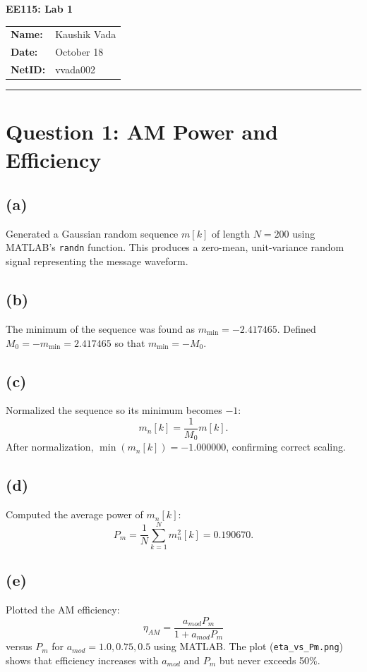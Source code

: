 \documentclass[11pt]{article}
\begin{document}
\begin{center}
  {\LARGE \textbf{EE115: Lab 1}}
\end{center}
\vspace{-0.25em}

\noindent
\begin{tabular}{@{}ll}
\textbf{Name:}  & Kaushik Vada \\
\textbf{Date:}  & October 18 \\
\textbf{NetID:} & vvada002
\end{tabular}

\vspace{0.75em}
\hrule
\vspace{1em}

\section*{Question 1: AM Power and Efficiency}

\subsection*{(a)}
Generated a Gaussian random sequence \( m[k] \) of length \( N = 200 \) using MATLAB's \texttt{randn} function. This produces a zero-mean, unit-variance random signal representing the message waveform.

\subsection*{(b)}
The minimum of the sequence was found as \( m_{\text{min}} = -2.417465 \). Defined \( M_0 = -m_{\text{min}} = 2.417465 \) so that \( m_{\text{min}} = -M_0 \).

\subsection*{(c)}
Normalized the sequence so its minimum becomes \(-1\):
\[
m_n[k] = \frac{1}{M_0} m[k].
\]
After normalization, \(\min(m_n[k]) = -1.000000\), confirming correct scaling.

\subsection*{(d)}
Computed the average power of \( m_n[k] \):
\[
P_m = \frac{1}{N} \sum_{k=1}^{N} m_n^2[k] = 0.190670.
\]

\subsection*{(e)}
Plotted the AM efficiency:
\[
\eta_{AM} = \frac{a_{mod} P_m}{1 + a_{mod} P_m}
\]
versus \( P_m \) for \( a_{mod} = 1.0, 0.75, 0.5 \) using MATLAB.  
The plot (\texttt{eta\_vs\_Pm.png}) shows that efficiency increases with \( a_{mod} \) and \( P_m \) but never exceeds 50\%.
\end{document}
